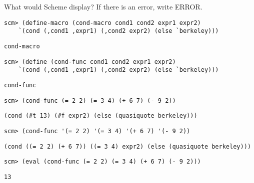 \question What would Scheme display? If there is an error, write ERROR.

\begin{lstlisting}
scm> (define-macro (cond-macro cond1 cond2 expr1 expr2)
	`(cond (,cond1 ,expr1) (,cond2 expr2) (else `berkeley)))
\end{lstlisting}
\begin{solution}[0.25in]
\begin{lstlisting}
cond-macro
\end{lstlisting}
\end{solution}

\begin{lstlisting}
scm> (define (cond-func cond1 cond2 expr1 expr2)
	`(cond (,cond1 ,expr1) (,cond2 expr2) (else `berkeley)))
\end{lstlisting}
\begin{solution}[0.25in]
\begin{lstlisting}
cond-func
\end{lstlisting}
\end{solution}

\begin{lstlisting}
scm> (cond-func (= 2 2) (= 3 4) (+ 6 7) (- 9 2))
\end{lstlisting}
\begin{solution}[0.25in]
\begin{lstlisting}
(cond (#t 13) (#f expr2) (else (quasiquote berkeley)))
\end{lstlisting}
\end{solution}

\begin{lstlisting}
scm> (cond-func '(= 2 2) '(= 3 4) '(+ 6 7) '(- 9 2))
\end{lstlisting}
\begin{solution}[0.25in]
\begin{lstlisting}
(cond ((= 2 2) (+ 6 7)) ((= 3 4) expr2) (else (quasiquote berkeley)))
\end{lstlisting}
\end{solution}

\begin{lstlisting}
scm> (eval (cond-func (= 2 2) (= 3 4) (+ 6 7) (- 9 2)))
\end{lstlisting}
\begin{solution}[0.25in]
\begin{lstlisting}
13
\end{lstlisting}
\end{solution}

